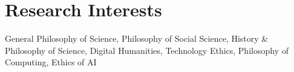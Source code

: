 \documentclass[
]{book}
\author{}
\date{}
\begin{document}
\frontmatter

\mainmatter
\chapter{Research Interests}\label{research-interests}

General Philosophy of Science, Philosophy of Social Science, History \& Philosophy of Science, Digital Humanities, Technology Ethics, Philosophy of Computing, Ethics of AI

\backmatter
\end{document}
